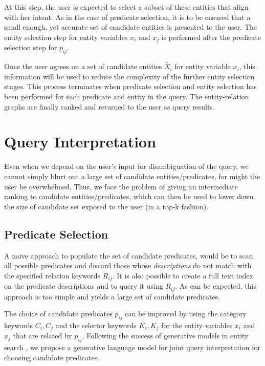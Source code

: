 \documentclass[a4paper, twoside, 12pt]{report}
\begin{document}
At this step, the user is expected to select a subset of these entities that align with her intent. As in the case of predicate selection, it is to be ensured that a small enough, yet accurate set of candidate entities is presented to the user. The entity selection step for entity variables $x_i$ and $x_j$ is performed after the predicate selection step for $p_{ij}$.

Once the user agrees on a set of candidate entities $\tilde{X_i}$ for entity variable $x_i$, this information will be used to reduce the complexity of the further entity selection stages. This process terminates when predicate selection and entity selection has been performed for each predicate and entity in the query. The entity-relation graphs are finally ranked and returned to the user as query results.


\section{Query Interpretation}
Even when we depend on the user's input for disambiguation of the query, we cannot simply blurt out a large set of candidate entities/predicates, for might the user be overwhelmed. Thus, we face the problem of giving an intermediate ranking to candidate entities/predicates, which can then be used to lower down the size of candidate set exposed to the user (in a top-k fashion).

\subsection{Predicate Selection} \label{predselint}
A naive approach to populate the set of candidate predicates, would be to scan all possible predicates and discard those whose \emph{descriptions} do not match with the specified relation keywords $R_{ij}$. It is also possible to create a full text index on the predicate descriptions and to query it using $R_{ij}$. As can be expected, this approach is too simple and yields a large set of candidate predicates.

The choice of candidate predicates $p_{ij}$ can be improved by using the category keywords $C_i, C_j$ and the selector keywords $K_i, K_j$ for the entity variables $x_i$ and $x_j$ that are related by $p_{ij}$. Following the success of generative models in entity search \cite{sawant2013learning}, we propose a generative language model for joint query interpretation for choosing candidate predicates.
\end{document}
